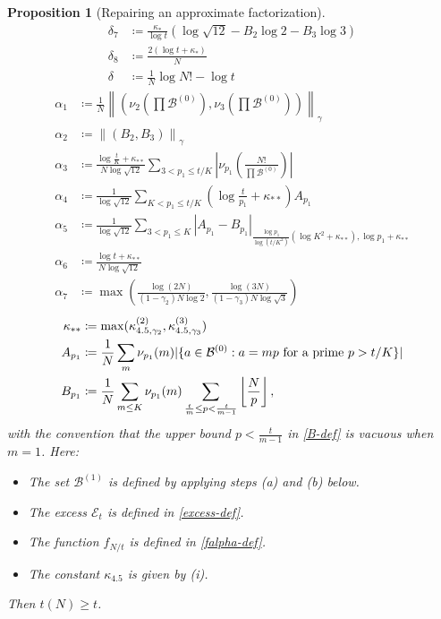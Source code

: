 \documentclass[10pt,a4paper,reqno]{amsart}
\numberwithin{equation}{section}
\theoremstyle{plain}
\newtheorem{proposition}[proposition]{Proposition}
\theoremstyle{definition}
\newcommand\tuple{{\mathcal B}}
\newcommand\excess{{\mathcal{E}}}
\begin{document}
\begin{proposition}[Repairing an approximate factorization]
\begin{align}
\delta_7 &\coloneqq \frac{\kappa_*}{\log t} \left( \log \sqrt{12} - B_2 \log 2 - B_3 \log 3\right)\label{delta7-def}  \\
\delta_8 &\coloneqq \frac{2(\log t + \kappa_*)}{N} \label{delta8-def}\\
\delta &\coloneqq \frac{1}{N} \log N! - \log t\label{delta-def}
\end{align}
\begin{align}
\alpha_1 &\coloneqq \frac{1}{N} \left\| \left( \nu_{2}\left(\prod \tuple^{(0)}\right), \nu_{3}\left(\prod \tuple^{(0)}\right)\right) \right\|_\gamma \label{alpha1-def}  \\
\alpha_2 &\coloneqq \left\| (B_2, B_3) \right\|_\gamma \label{alpha2-def}  \\
\alpha_3 &\coloneqq \frac{\log \frac{t}{K} + \kappa_{**}}{N\log \sqrt{12}} \sum_{3 < p_1 \leq t/K} \left|\nu_{p_1}\left( \frac{N!}{\prod \tuple^{(0)}} \right)\right| \label{alpha3-def}  \\
\alpha_4 &\coloneqq \frac{1}{\log \sqrt{12}} \sum_{K < p_1 \leq t/K} \left(\log \frac{t}{p_1} + \kappa_{**}\right) A_{p_1} \label{alpha4-def}  \\
\alpha_5 &\coloneqq \frac{1}{\log \sqrt{12}} \sum_{3 < p_1 \leq K} \left|A_{p_1} - B_{p_1}\right|_{\frac{\log p_1}{\log(t/K^2)} (\log K^2 + \kappa_{**}), \log p_1 + \kappa_{**}} \label{alpha5-def}  \\
\alpha_6 &\coloneqq \frac{\log t + \kappa_{**}}{N\log \sqrt{12}}  \label{alpha6-def}  \\
\alpha_7 &\coloneqq \max\left( \frac{\log(2N)}{(1-\gamma_2)N\log 2},  \frac{\log(3N)}{(1-\gamma_3)N\log \sqrt{3}}\right)\label{alpha7-def}
\end{align}
\begin{align}
\kappa_{**} &\coloneqq \max(\kappa^{(2)}_{4.5, \gamma_2}, \kappa^{(3)}_{4.5, \gamma_3}) \label{kappastar-def}  \\
A_{p_1} &\coloneqq \frac{1}{N} \sum_m \nu_{p_1}(m) | \{ a \in \tuple^{(0)}: a = mp \hbox{ for a prime } p > t/K \}| \label{A-def} \\
B_{p_1} &\coloneqq \frac{1}{N} \sum_{m \leq K} \nu_{p_1}(m) \sum_{\frac{t}{m} \leq p < \frac{t}{m-1}} \left \lfloor \frac{N}{p} \right\rfloor,\label{B-def}
\end{align}
with the convention that the upper bound $p < \frac{t}{m-1}$ in \eqref{B-def} is vacuous when $m=1$.  Here:
\begin{itemize}
  \item The set ${\mathcal B}^{(1)}$ is defined by applying steps (a) and (b) below.
  \item The excess $\excess_t$ is defined in \eqref{excess-def}.
  \item The function $f_{N/t}$ is defined in \eqref{falpha-def}.
  \item The constant $\kappa_{4.5}$ is given by (i).
\end{itemize}
Then $t(N) \geq t$.
\end{proposition}
\end{document}
